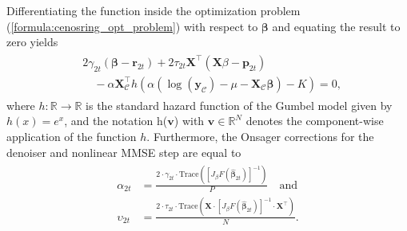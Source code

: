 \noindent 
\begin{lemma}
    Differentiating the function inside the optimization problem (\ref{formula:cenosring_opt_problem}) with respect to $\bm{\beta}$ and equating the result to zero yields 
    \begin{align}
    \begin{split}
    & 2 \gamma_{2t} (\bm{\beta} - \bm{r}_{2t}) + 2 \tau_{2t} \bm{X}^\top(\bm{X}\beta - \bm{p}_{2t}) \\
    & \quad - \alpha \bm{X}_\mathcal{C}^\top h(\alpha(\log(\bm{y}_\mathcal{C}) - \mu - \bm{X}_\mathcal{C} \bm{\beta})-K)= 0,
    \end{split}
    \end{align}
    where $h:\mathbb{R} \to \mathbb{R}$ is the standard hazard function of the Gumbel model given by $h(x) = e^x$, and the notation h($\bm{v}$) with $\bm{v}\in \mathbb{R}^{N}$ denotes the component-wise application of the function $h$. Furthermore, the Onsager corrections for the denoiser and nonlinear MMSE step are equal to 
\begin{align}
    \begin{split}
    \alpha_{2t} & = \frac{2 \cdot \gamma_{2t} \cdot \text{Trace}([J_{\beta}F(\hat{\bm{\beta}}_{2t})]^{-1})}{P}
    \quad \text{and} \\
    \upsilon_{2t} & = \frac{2 \cdot \tau_{2t} \cdot \text{Trace}(\bm{X} \cdot [J_{\beta}F(\hat{\bm{\beta}}_{2t})]^{-1} \cdot \bm{X}^\top)}{N}.
    \end{split}
\end{align}
\end{lemma}

